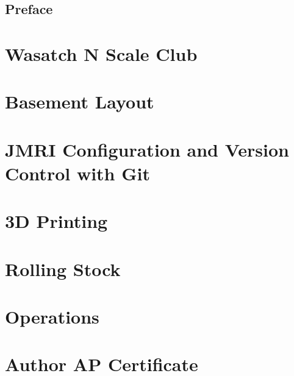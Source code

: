 \documentclass[12pt,twoside]{book}
\begin{document}
\frontmatter
\pagestyle{empty}


\dominitoc
\tableofcontents
\listoftables
\listoffigures
\chapter{Preface}

\mainmatter
\pagestyle{protocol}
\part{Wasatch N Scale Club}



\part{Basement Layout}







\part{JMRI Configuration and Version Control with Git}




\part{3D Printing}


\part{Rolling Stock}


\part{Operations}


\part{Author AP Certificate}



\backmatter
{}
\footnotesize
\printindex
\normalsize
{}
\end{document}
